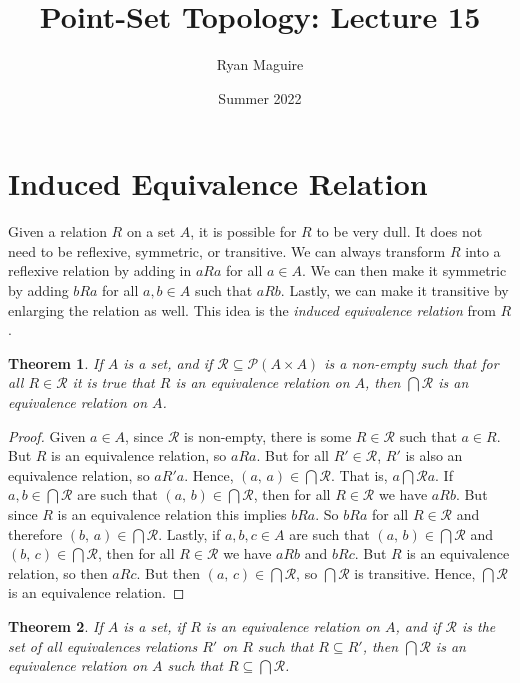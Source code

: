 \documentclass{article}
\title{Point-Set Topology: Lecture 15}
\author{Ryan Maguire}
\date{Summer 2022}
\theoremstyle{plain}
\newtheorem{theorem}{Theorem}[section]
\theoremstyle{normal}
\begin{document}
    \maketitle
    \section{Induced Equivalence Relation}
        Given a relation $R$ on a set $A$, it is possible for $R$ to be very
        dull. It does not need to be reflexive, symmetric, or transitive. We
        can always transform $R$ into a reflexive relation by adding in
        $aRa$ for all $a\in{A}$. We can then make it symmetric by adding
        $bRa$ for all $a,b\in{A}$ such that $aRb$. Lastly, we can make it
        transitive by enlarging the relation as well. This idea is the
        \textit{induced equivalence relation} from $R$.
        \begin{theorem}
            If $A$ is a set, and if
            $\mathcal{R}\subseteq\mathcal{P}(A\times{A})$ is a non-empty such
            that for all $R\in\mathcal{R}$ it is true that $R$ is an
            equivalence relation on $A$, then $\bigcap\mathcal{R}$ is an
            equivalence relation on $A$.
        \end{theorem}
        \begin{proof}
            Given $a\in{A}$, since $\mathcal{R}$ is non-empty, there is some
            $R\in\mathcal{R}$ such that $a\in{R}$. But $R$ is an equivalence
            relation, so $aRa$. But for all $R'\in\mathcal{R}$, $R'$ is also
            an equivalence relation, so $aR'a$. Hence,
            $(a,\,a)\in\bigcap\mathcal{R}$. That is, $a\bigcap\mathcal{R}a$.
            If $a,b\in\bigcap\mathcal{R}$ are such that
            $(a,\,b)\in\bigcap\mathcal{R}$, then for all $R\in\mathcal{R}$ we
            have $aRb$. But since $R$ is an equivalence relation this implies
            $bRa$. So $bRa$ for all $R\in\mathcal{R}$ and therefore
            $(b,\,a)\in\bigcap\mathcal{R}$. Lastly, if $a,b,c\in{A}$ are such
            that $(a,\,b)\in\bigcap\mathcal{R}$ and
            $(b,\,c)\in\bigcap\mathcal{R}$, then for all $R\in\mathcal{R}$ we
            have $aRb$ and $bRc$. But $R$ is an equivalence relation, so then
            $aRc$. But then $(a,\,c)\in\bigcap\mathcal{R}$, so
            $\bigcap\mathcal{R}$ is transitive. Hence, $\bigcap\mathcal{R}$ is
            an equivalence relation.
        \end{proof}
        \begin{theorem}
            If $A$ is a set, if $R$ is an equivalence relation on $A$, and if
            $\mathcal{R}$ is the set of all equivalences relations
            $R'$ on $R$ such that $R\subseteq{R}'$, then
            $\bigcap\mathcal{R}$ is an equivalence relation on $A$ such that
            $R\subseteq\bigcap\mathcal{R}$.
        \end{theorem}
\end{document}
